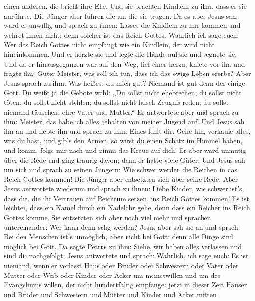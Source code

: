 einen anderen, die bricht ihre Ehe.  Und sie brachten
Kindlein zu ihm, dass er sie anrührte. Die Jünger aber fuhren die an,
die sie trugen.  Da es aber Jesus sah, ward er unwillig und
sprach zu ihnen: Lasset die Kindlein zu mir kommen und wehret ihnen
nicht; denn solcher ist das Reich Gottes.  Wahrlich ich
sage euch: Wer das Reich Gottes nicht empfängt wie ein Kindlein, der
wird nicht hineinkommen.  Und er herzte sie und legte die
Hände auf sie und segnete sie.  Und da er hinausgegangen
war auf den Weg, lief einer herzu, kniete vor ihn und fragte ihn: Guter
Meister, was soll ich tun, dass ich das ewige Leben ererbe?
 Aber Jesus sprach zu ihm: Was heißest du mich gut? Niemand
ist gut denn der einige Gott.  Du weißt ja die Gebote wohl:
„Du sollst nicht ehebrechen; du sollst nicht töten; du sollst nicht
stehlen; du sollst nicht falsch Zeugnis reden; du sollst niemand
täuschen; ehre Vater und Mutter.``  Er antwortete aber und
sprach zu ihm: Meister, das habe ich alles gehalten von meiner Jugend
auf.  Und Jesus sah ihn an und liebte ihn und sprach zu
ihm: Eines fehlt dir. Gehe hin, verkaufe alles, was du hast, und gib's
den Armen, so wirst du einen Schatz im Himmel haben, und komm, folge mir
nach und nimm das Kreuz auf dich!  Er aber ward unmutig
über die Rede und ging traurig davon; denn er hatte viele Güter.
 Und Jesus sah um sich und sprach zu seinen Jüngern: Wie
schwer werden die Reichen in das Reich Gottes kommen!  Die
Jünger aber entsetzten sich über seine Rede. Aber Jesus antwortete
wiederum und sprach zu ihnen: Liebe Kinder, wie schwer ist's, dass die,
die ihr Vertrauen auf Reichtum setzen, ins Reich Gottes kommen!
 Es ist leichter, dass ein Kamel durch ein Nadelöhr gehe,
denn dass ein Reicher ins Reich Gottes komme.  Sie
entsetzten sich aber noch viel mehr und sprachen untereinander: Wer kann
denn selig werden?  Jesus aber sah sie an und sprach: Bei
den Menschen ist's unmöglich, aber nicht bei Gott; denn alle Dinge sind
möglich bei Gott.  Da sagte Petrus zu ihm: Siehe, wir haben
alles verlassen und sind dir nachgefolgt.  Jesus antwortete
und sprach: Wahrlich, ich sage euch: Es ist niemand, wenn er verlässt
Haus oder Brüder oder Schwestern oder Vater oder Mutter oder Weib oder
Kinder oder Äcker um meinetwillen und um des Evangeliums willen,
 der nicht hundertfältig empfange: jetzt in dieser Zeit
Häuser und Brüder und Schwestern und Mütter und Kinder und Äcker mitten
